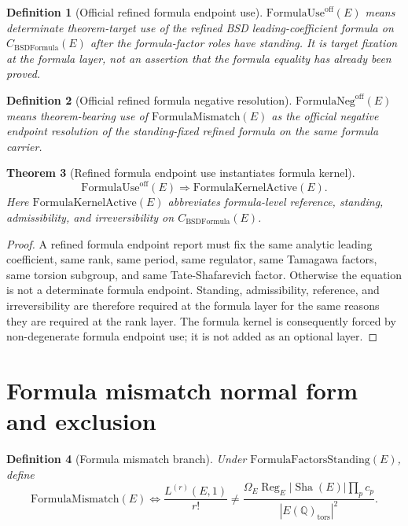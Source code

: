 \documentclass[11pt]{article}
\newtheorem{theorem}{Theorem}[section]
\newtheorem{definition}[theorem]{Definition}
\newcommand{\Q}{\mathbb{Q}}
\newcommand{\Sha}{\operatorname{Sha}}
\newcommand{\Reg}{\operatorname{Reg}}
\newcommand{\tors}{\operatorname{tors}}
\newcommand{\BSDFormula}{\mathrm{BSDFormula}}
\newcommand{\FormulaMismatch}{\mathrm{FormulaMismatch}}
\newcommand{\FormulaUse}{\mathrm{FormulaUse}^{\mathrm{off}}}
\newcommand{\FormulaNeg}{\mathrm{FormulaNeg}^{\mathrm{off}}}
\begin{document}
\begin{definition}[Official refined formula endpoint use]\label{def:official-refined-formula-use}
$\FormulaUse(E)$ means determinate theorem-target use of the refined BSD leading-coefficient formula on $C_{\BSDFormula}(E)$ after the formula-factor roles have standing. It is target fixation at the formula layer, not an assertion that the formula equality has already been proved.
\end{definition}

\begin{definition}[Official refined formula negative resolution]\label{def:official-refined-formula-negative}
$\FormulaNeg(E)$ means theorem-bearing use of $\FormulaMismatch(E)$ as the official negative endpoint resolution of the standing-fixed refined formula on the same formula carrier.
\end{definition}

\begin{theorem}[Refined formula endpoint use instantiates formula kernel]\label{thm:formula-kernel}
\[
\FormulaUse(E)
\Rightarrow
\mathrm{FormulaKernelActive}(E).
\]
Here $\mathrm{FormulaKernelActive}(E)$ abbreviates formula-level reference, standing, admissibility, and irreversibility on $C_{\BSDFormula}(E)$.
\end{theorem}

\begin{proof}
A refined formula endpoint report must fix the same analytic leading coefficient, same rank, same period, same regulator, same Tamagawa factors, same torsion subgroup, and same Tate-Shafarevich factor. Otherwise the equation is not a determinate formula endpoint. Standing, admissibility, reference, and irreversibility are therefore required at the formula layer for the same reasons they are required at the rank layer. The formula kernel is consequently forced by non-degenerate formula endpoint use; it is not added as an optional layer.
\end{proof}

\section{Formula mismatch normal form and exclusion}

\begin{definition}[Formula mismatch branch]
Under $\mathrm{FormulaFactorsStanding}(E)$, define
\[
\FormulaMismatch(E)
\Longleftrightarrow
\frac{L^{(r)}(E,1)}{r!}
\ne
\frac{\Omega_E\Reg_E |\Sha(E)|\prod_p c_p}{|E(\Q)_{\tors}|^2}.
\]
\end{definition}
\end{document}
